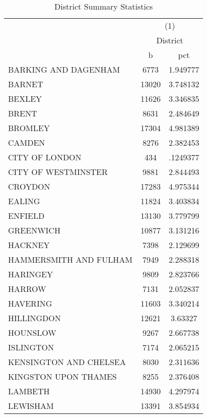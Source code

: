 {
\def\sym#1{\ifmmode^{#1}\else\(^{#1}\)\fi}
\begin{longtable}{l*{1}{cc}}
\caption{District Summary Statistics}\\
\toprule\endfirsthead\midrule\endhead\midrule\endfoot\endlastfoot
                    &\multicolumn{2}{c}{(1)}  \\
                    &\multicolumn{2}{c}{District}\\
                    &           b&         pct\\
\midrule
BARKING AND DAGENHAM&        6773&    1.949777\\
BARNET              &       13020&    3.748132\\
BEXLEY              &       11626&    3.346835\\
BRENT               &        8631&    2.484649\\
BROMLEY             &       17304&    4.981389\\
CAMDEN              &        8276&    2.382453\\
CITY OF LONDON      &         434&    .1249377\\
CITY OF WESTMINSTER &        9881&    2.844493\\
CROYDON             &       17283&    4.975344\\
EALING              &       11824&    3.403834\\
ENFIELD             &       13130&    3.779799\\
GREENWICH           &       10877&    3.131216\\
HACKNEY             &        7398&    2.129699\\
HAMMERSMITH AND FULHAM&        7949&    2.288318\\
HARINGEY            &        9809&    2.823766\\
HARROW              &        7131&    2.052837\\
HAVERING            &       11603&    3.340214\\
HILLINGDON          &       12621&     3.63327\\
HOUNSLOW            &        9267&    2.667738\\
ISLINGTON           &        7174&    2.065215\\
KENSINGTON AND CHELSEA&        8030&    2.311636\\
KINGSTON UPON THAMES&        8255&    2.376408\\
LAMBETH             &       14930&    4.297974\\
LEWISHAM            &       13391&    3.854934\\

\end{longtable}}
